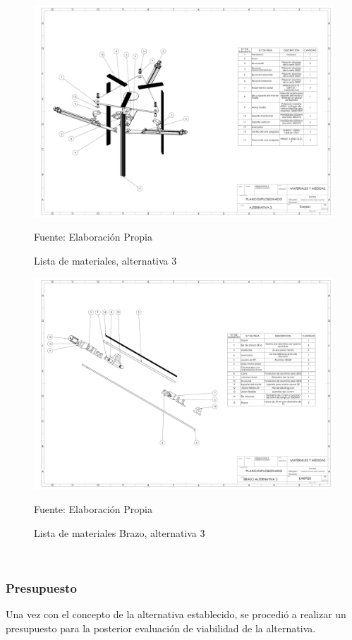 \begin{figure}[ht!]
    \centering
    \includegraphics[width =  \textwidth]{Cap3_DisenoConceptual/Figura/Planowilliam.pdf}
    \caption{Lista de materiales, alternativa 3}{Fuente: Elaboración Propia}
    \label{fig:Plano_alt_3}
\end{figure}
\begin{figure}[ht]
    \centering
    \includegraphics[width =  \textwidth]{Cap3_DisenoConceptual/Figura/PlanoBrazo.pdf}
    \caption{Lista de materiales Brazo, alternativa 3}{Fuente: Elaboración Propia}
    \label{fig:Plano_alt_3.2}
\end{figure}

\newpage
~
\newpage

\subsubsection{Presupuesto}
Una vez con el concepto de la alternativa establecido, se procedió a realizar un presupuesto para la posterior evaluación de viabilidad de la alternativa.


